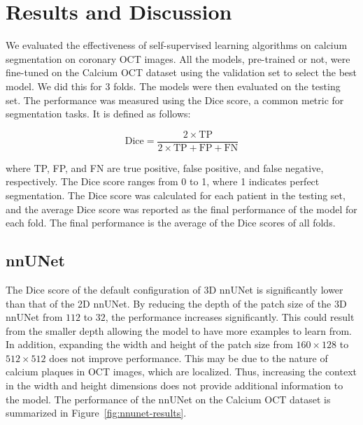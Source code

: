 \documentclass[a4paper,11pt,oneside]{report}
\begin{document}
\chapter{Results and Discussion}


We evaluated the effectiveness of self-supervised learning algorithms on calcium segmentation on coronary OCT images. All the models, pre-trained or not, were fine-tuned on the Calcium OCT dataset using the validation set to select the best model. We did this for 3 folds. The models were then evaluated on the testing set. The performance was measured using the Dice score, a common metric for segmentation tasks. It is defined as follows:

\begin{equation}
    \text{Dice} = \frac{2 \times \text{TP}}{2 \times \text{TP} + \text{FP} + \text{FN}}
\end{equation}

where TP, FP, and FN are true positive, false positive, and false negative, respectively. The Dice score ranges from 0 to 1, where 1 indicates perfect segmentation. The Dice score was calculated for each patient in the testing set, and the average Dice score was reported as the final performance of the model for each fold. The final performance is the average of the Dice scores of all folds.

\section{nnUNet}\label{sec:result:nnunet}
The Dice score of the default configuration of 3D nnUNet is significantly lower than that of the 2D nnUNet. By reducing the depth of the patch size of the 3D nnUNet from $112$ to $32$, the performance increases significantly. This could result from the smaller depth allowing the model to have more examples to learn from. In addition, expanding the width and height of the patch size from $160\times 128$ to $512\times 512$ does not improve performance. This may be due to the nature of calcium plaques in OCT images, which are localized. Thus, increasing the context in the width and height dimensions does not provide additional information to the model. The performance of the nnUNet on the Calcium OCT dataset is summarized in Figure~\ref{fig:nnunet-results}.
\end{document}
